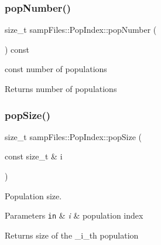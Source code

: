 \subsubsection{\texorpdfstring{pop\+Number()}{popNumber()}\hspace{0.1cm}{\footnotesize\ttfamily [2/2]}}
{\footnotesize\ttfamily size\+\_\+t samp\+Files\+::\+Pop\+Index\+::pop\+Number (\begin{DoxyParamCaption}{ }\end{DoxyParamCaption}) const\hspace{0.3cm}{\ttfamily [inline]}}



{\ttfamily const} number of populations 

\begin{DoxyReturn}{Returns}
number of populations 
\end{DoxyReturn}
\mbox{\label{classsamp_files_1_1_pop_index_a5a58b623938c025a287711de86a4021a}} 
\subsubsection{\texorpdfstring{pop\+Size()}{popSize()}\hspace{0.1cm}{\footnotesize\ttfamily [1/2]}}
{\footnotesize\ttfamily size\+\_\+t samp\+Files\+::\+Pop\+Index\+::pop\+Size (\begin{DoxyParamCaption}\item[{const size\+\_\+t \&}]{i }\end{DoxyParamCaption})\hspace{0.3cm}{\ttfamily [inline]}}



Population size. 


\begin{DoxyParams}[1]{Parameters}
\mbox{\tt in}  & {\em i} & population index \\
\hline
\end{DoxyParams}
\begin{DoxyReturn}{Returns}
size of the \+\_\+i\+\_\+th population 
\end{DoxyReturn}
\mbox{\label{classsamp_files_1_1_pop_index_aef299f007e2123b430d6d36fa50d4d16}} 
